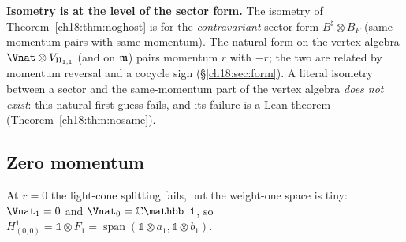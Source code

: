 \begin{warning}
\textbf{Isometry is at the level of the sector form.}  The isometry of Theorem~\ref{ch18:thm:noghost} is for the
\emph{contravariant} sector form $B^\natural\otimes B_F$ (same momentum pairs with same momentum).  The natural form
on the vertex algebra $\Vnat\otimes V_{\chXVIIIII}$ (and on $\mathfrak{m}$) pairs momentum $r$ with $-r$; the two are related
by momentum reversal and a cocycle sign (\S\ref{ch18:sec:form}).  A literal isometry between a sector and
the same-momentum part of the vertex algebra \emph{does not exist}: this natural first guess fails, and its failure is a
Lean theorem (Theorem~\ref{ch18:thm:nosame}).
\end{warning}

\subsection{Zero momentum}\label{ch18:sec:zero}

At $r=0$ the light-cone splitting fails, but the weight-one space is tiny: $\Vnat_1=0$ and $\Vnat_0=\mathbb C\mathbb 1$, so
$H^1_{(0,0)}=\mathbb 1\otimes F_1=\operatorname{span}(\mathbb 1\otimes a_1,\mathbb 1\otimes b_1)$.

